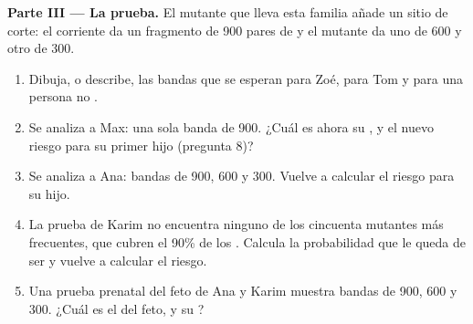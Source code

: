 \begin{problem}
\medskip
\noindent\textbf{Parte III --- La prueba.}
El  mutante que lleva esta familia añade un sitio de corte: el
 corriente da un fragmento de 900 pares de  y el mutante da
uno de 600 y otro de 300.
\begin{enumerate}[resume]
  \item Dibuja, o describe, las bandas que se esperan para Zoé, para
        Tom y para una persona no .
  \item Se analiza a Max: una sola banda de 900. ¿Cuál es ahora su
        , y el nuevo riesgo para su primer hijo (pregunta 8)?
  \item Se analiza a Ana: bandas de 900, 600 y 300. Vuelve a calcular
        el riesgo para su hijo.
  \item La prueba de Karim no encuentra ninguno de los cincuenta 
        mutantes más frecuentes, que cubren el 90\% de los .
        Calcula la probabilidad que le queda de ser  y vuelve a
        calcular el riesgo.
  \item Una prueba prenatal del feto de Ana y Karim muestra bandas de
        900, 600 y 300. ¿Cuál es el  del feto, y su ?
\end{enumerate}


\end{problem}
